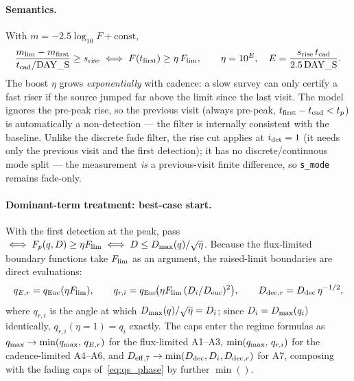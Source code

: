 \documentclass[11pt,a4paper]{article}
\begin{document}
\paragraph{Semantics.} With $m=-2.5\log_{10}F+\text{const}$,
\begin{equation}
\label{eq:eta_rise}
\frac{m_{\rm lim}-m_{\rm first}}{t_{\rm cad}/\text{DAY\_S}}\ge s_{\rm rise}
\iff
F(t_{\rm first})\ge\eta\,F_{\rm lim},\qquad
\eta=10^{E},\quad E=\frac{s_{\rm rise}\,t_{\rm cad}}{2.5\,\text{DAY\_S}}.
\end{equation}
The boost $\eta$ grows \emph{exponentially} with cadence: a slow survey can only certify a fast riser if the source jumped far above the limit since the last visit. The model ignores the pre-peak rise, so the previous visit (always pre-peak, $t_{\rm first}-t_{\rm cad}<t_p$) is automatically a non-detection --- the filter is internally consistent with the baseline. Unlike the discrete fade filter, the rise cut applies at $i_{\rm det}=1$ (it needs only the previous visit and the first detection); it has no discrete/continuous mode split --- the measurement \emph{is} a previous-visit finite difference, so \texttt{s\_mode} remains fade-only.

\paragraph{Dominant-term treatment: best-case start.} With the first detection at the peak, pass $\iff F_p(q,D)\ge\eta F_{\rm lim}\iff D\le D_{\rm max}(q)/\sqrt\eta$. Because the flux-limited boundary functions take $F_{\rm lim}$ as an argument, the raised-limit boundaries are direct evaluations:
\[
q_{E,r}=q_{\rm Euc}(\eta F_{\rm lim}),\qquad
q_{r,i}=q_{\rm Euc}\!\bigl(\eta F_{\rm lim}\,(D_i/D_{\rm euc})^2\bigr),\qquad
D_{{\rm dec},r}=D_{\rm dec}\,\eta^{-1/2},
\]
where $q_{r,i}$ is the angle at which $D_{\rm max}(q)/\sqrt\eta=D_i$; since $D_i=D_{\rm max}(q_i)$ identically, $q_{r,i}(\eta{=}1)=q_i$ exactly. The caps enter the regime formulas as $q_{\rm max}\to\min(q_{\rm max},\,q_{E,r})$ for the flux-limited A1--A3, $\min(q_{\rm max},\,q_{r,i})$ for the cadence-limited A4--A6, and $D_{\rm eff,7}\to\min(D_{\rm dec},D_i,D_{{\rm dec},r})$ for A7, composing with the fading caps of~\eqref{eq:qs_phase} by further $\min()$.
\end{document}
